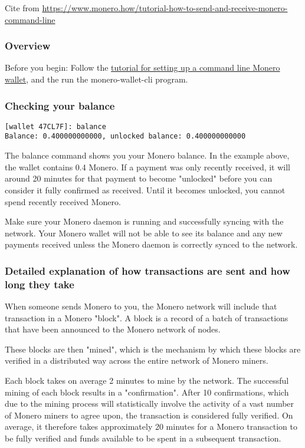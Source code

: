	Cite from \url{https://www.monero.how/tutorial-how-to-send-and-receive-monero-command-line}
\subsubsection{Overview}
	Before you begin: Follow the \href{https://www.monero.how/tutorial-how-to-create-a-command-line-monero-wallet}{tutorial for setting up a command line Monero wallet}, and the run the monero-wallet-cli program.
\subsubsection{Checking your balance}
\begin{lstlisting}
[wallet 47CL7F]: balance
Balance: 0.400000000000, unlocked balance: 0.400000000000
\end{lstlisting}
	The balance command shows you your Monero balance. In the example above, the wallet contains 0.4 Monero. If a payment was only recently received, it will around 20 minutes for that payment to become "unlocked" before you can consider it fully confirmed as received. Until it becomes unlocked, you cannot spend recently received Monero. 
	\begin{importantbox}
		Make sure your Monero daemon is running and successfully syncing with the network. Your Monero wallet will not be able to see its balance and any new payments received unless the Monero daemon is correctly synced to the network.
	\end{importantbox}
\subsubsection{Detailed explanation of how transactions are sent and how long they take}
	When someone sends Monero to you, the Monero network will include that transaction in a Monero "block". A block is a record of a batch of transactions that have been announced to the Monero network of nodes. \par
	These blocks are then "mined", which is the mechanism by which these blocks are verified in a distributed way across the entire network of Monero miners. \par
	Each block takes on average 2 minutes to mine by the network. The successful mining of each block results in a "confirmation". After 10 confirmations, which due to the mining process will statistically involve the activity of a vast number of Monero miners to agree upon, the transaction is considered fully verified. On average, it therefore takes approximately 20 minutes for a Monero transaction to be fully verified and funds available to be spent in a subsequent transaction.
